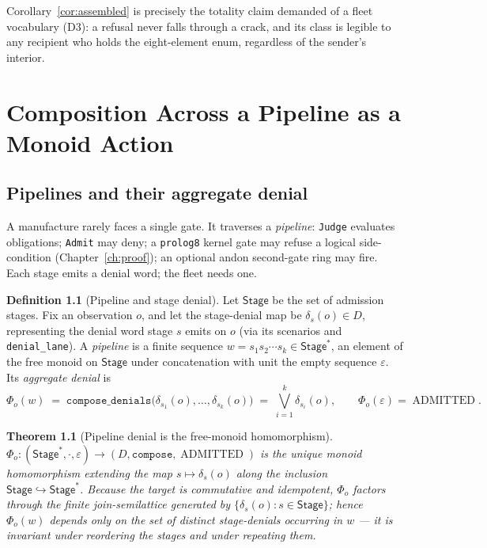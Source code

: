 \documentclass[11pt,oneside]{book}
\theoremstyle{definition}
\newtheorem{definition}{Definition}[chapter]
\theoremstyle{plain}
\newtheorem{theorem}{Theorem}[chapter]
\theoremstyle{remark}
\newcommand{\code}[1]{\texttt{#1}}
\newcommand{\Deny}{D}                 %
\newcommand{\Adml}{\operatorname{ADMITTED}}          %
\begin{document}
Corollary~\ref{cor:assembled} is precisely the totality claim demanded of a fleet vocabulary (D3): a refusal never falls through a crack, and its class is legible to any recipient who holds the eight-element enum, regardless of the sender's interior. %

\chapter{Composition Across a Pipeline as a Monoid Action}
\label{ch:pipe}

\section{Pipelines and their aggregate denial}

A manufacture rarely faces a single gate. %
It traverses a \emph{pipeline}: \code{Judge} evaluates obligations; \code{Admit} may deny; a \code{prolog8} kernel gate may refuse a logical side-condition (Chapter~\ref{ch:proof}); an optional andon second-gate ring may fire. %
Each stage emits a denial word; the fleet needs one. %

\begin{definition}[Pipeline and stage denial]\label{def:pipeline}
Let $\mathsf{Stage}$ be the set of admission stages. %
Fix an observation $o$, and let the stage-denial map be $\delta_s(o) \in \Deny$, representing the denial word stage $s$ emits on $o$ (via its scenarios and \code{denial\_lane}). %
A \emph{pipeline} is a finite sequence $w=s_1 s_2\cdots s_k\in\mathsf{Stage}^{*}$, an element of the free monoid on $\mathsf{Stage}$ under concatenation with unit the empty sequence $\varepsilon$. %
Its \emph{aggregate denial} is %
\[
\Phi_o(w)\;=\;\code{compose\_denials}\bigl(\delta_{s_1}(o),\dots,\delta_{s_k}(o)\bigr)
\;=\;\bigvee_{i=1}^{k}\delta_{s_i}(o),\qquad \Phi_o(\varepsilon)=\Adml.
\] %
\end{definition}

\begin{theorem}[Pipeline denial is the free-monoid homomorphism]\label{thm:freehom}
$\Phi_o:(\mathsf{Stage}^{*},\cdot,\varepsilon)\to(\Deny,\code{compose},\Adml)$ is the unique monoid homomorphism extending the map $s \mapsto \delta_s(o)$ along the inclusion $\mathsf{Stage}\hookrightarrow\mathsf{Stage}^{*}$. %
Because the target is commutative and idempotent, $\Phi_o$ factors through the finite join-semilattice generated by $\{\delta_s(o):s\in\mathsf{Stage}\}$; hence $\Phi_o(w)$ depends only on the \emph{set} of distinct stage-denials occurring in $w$ --- it is invariant under reordering the stages and under repeating them. %
\end{theorem}
\end{document}

